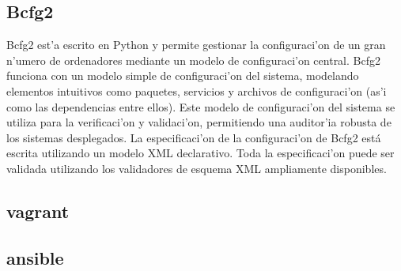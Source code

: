 \subsection{Bcfg2}
Bcfg2 est'a escrito en Python y permite gestionar la configuraci'on de un gran n'umero de ordenadores mediante un modelo de configuraci'on central. Bcfg2 funciona con un modelo simple de configuraci'on del sistema, modelando elementos intuitivos como paquetes, servicios y archivos de configuraci'on (as'i como las dependencias entre ellos). Este modelo de configuraci'on del sistema se utiliza para la verificaci'on  y validaci'on, permitiendo una auditor'ia robusta de los sistemas desplegados. La especificaci'on de la configuraci'on de Bcfg2 está escrita utilizando un modelo XML declarativo. Toda la especificaci'on puede ser validada utilizando los validadores de esquema XML ampliamente disponibles. \cite{bdfg215}

\subsection{vagrant}

\subsection{ansible}


